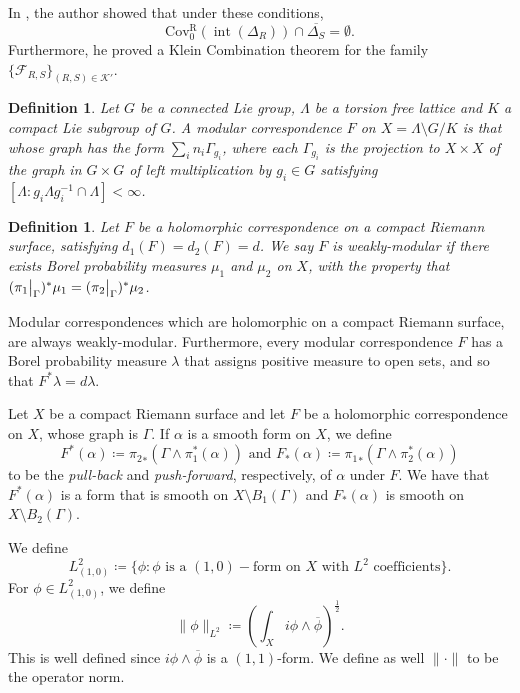 \documentclass[11pt,letterpaper]{article}
\newtheorem{definition}[theorem]{Definition}
\theoremstyle{definition}
\def\covr{\operatorname{Cov^R_0}}
\def\interior{\operatorname{int}}
\newcommand\restr[2]{{%
  \left.\kern-\nulldelimiterspace %
  #1 %
  \vphantom{\big|} %
  \right|_{#2} %
  }}
\begin{document}
In \cite{Bul00}, the author showed that under these conditions,
$$\covr(\interior(\Delta_R))\cap\overline{\Delta_S}=\emptyset.$$
Furthermore, he proved a Klein Combination theorem for the family $\lbrace\mathcal{F}_{R,S}\rbrace_{(R,S)\in\mathcal{K}'}$.


\begin{definition}
Let $G$ be a connected Lie group, $\Lambda$ be a torsion free lattice and $K$ a compact Lie subgroup of $G$. A modular correspondence $F$ on $X=\Lambda\setminus G/K$ is that whose graph has the form $\sum_i n_i\Gamma_{g_i}$, where each $\Gamma_{g_i}$ is the projection to $X\times X$ of the graph in $G\times G$ of left multiplication by $g_i\in G$ satisfying $[\Lambda:g_i\Lambda g_i^{-1}\cap\Lambda]<\infty$. 
\end{definition}

\begin{definition}
Let $F$ be a holomorphic correspondence on a compact Riemann surface, satisfying $d_1(F)=d_2(F)=d$. We say $F$ is \emph{weakly-modular} if there exists Borel probability measures $\mu_1$ and $\mu_2$ on $X$, with the property that $(\restr{\pi_1}{\Gamma})^*\mu_1=(\restr{\pi_2}{\Gamma})^*\mu_2$.
\end{definition}

Modular correspondences which are holomorphic on a compact Riemann surface, are always weakly-modular. Furthermore, every modular correspondence $F$ has a Borel probability measure $\lambda$ that assigns positive measure to open sets, and so that $F^*\lambda=d\lambda$.%


Let $X$ be a compact Riemann surface and let $F$ be a holomorphic correspondence on $X$, whose graph is $\Gamma$. If $\alpha$ is a smooth form on $X$, we define
$$F^*(\alpha)\coloneqq{\pi_2}_*(\Gamma\wedge\pi_1^*(\alpha))\mbox{ and }F_*(\alpha)\coloneqq{\pi_1}_*(\Gamma\wedge\pi_2^*(\alpha))$$
to be the \emph{pull-back} and \emph{push-forward}, respectively, of $\alpha$ under $F$. We have that $F^*(\alpha)$ is a form that is smooth on $X\setminus B_1(\Gamma)$ and $F_*(\alpha)$ is smooth on $X\setminus B_2(\Gamma)$. 

We define
$$L^2_{(1,0)}\coloneqq\lbrace\phi: \phi\mbox{ is a }(1,0)-\mbox{form on }X\mbox{ with }L^2\mbox{ coefficients}\rbrace.$$
For $\phi\in L^2_{(1,0)}$, we define
$$\|\phi\|_{L^2}\coloneqq\left(\int_X i\phi\wedge\overline{\phi}\right)^{\frac{1}{2}}.$$
This is well defined since $i\phi\wedge\overline{\phi}$ is a $(1,1)$-form. %
We define as well $\|\cdot\|$ to be the operator norm.
\end{document}
